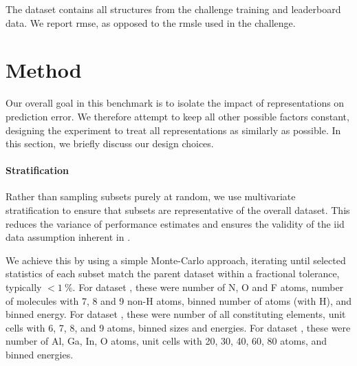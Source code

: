 The dataset contains all structures from the challenge training and leaderboard data.
We report \gls{rmse}, as opposed to the \gls{rmsle} used in the challenge.

\clearpage
\section{Method}

Our overall goal in this benchmark is to isolate the impact of representations on prediction error.
We therefore attempt to keep all other possible factors constant, designing the experiment to treat all representations as similarly as possible. In this section, we briefly discuss our design choices.

\paragraph{Stratification} 
Rather than sampling subsets purely at random, we use multivariate stratification to ensure that subsets are representative of the overall dataset.
This reduces the variance of performance estimates and ensures the validity of the \gls{iid} data assumption inherent in \ml.

We achieve this by using a simple Monte-Carlo approach, iterating until selected statistics of each subset match the parent dataset within a fractional tolerance, typically ${<}\qty{1}{\percent}$.
For dataset \dsgdb, these were number of N, O and F atoms, number of molecules with 7, 8 and 9 non-H atoms, binned number of atoms (with H), and binned energy.
For dataset \dsba, these were number of all constituting elements, unit cells with 6, 7, 8, and 9 atoms, binned sizes and energies. 
For dataset \dstco, these were number of Al, Ga, In, O atoms, unit cells with 20, 30, 40, 60, 80 atoms, and binned energies.

